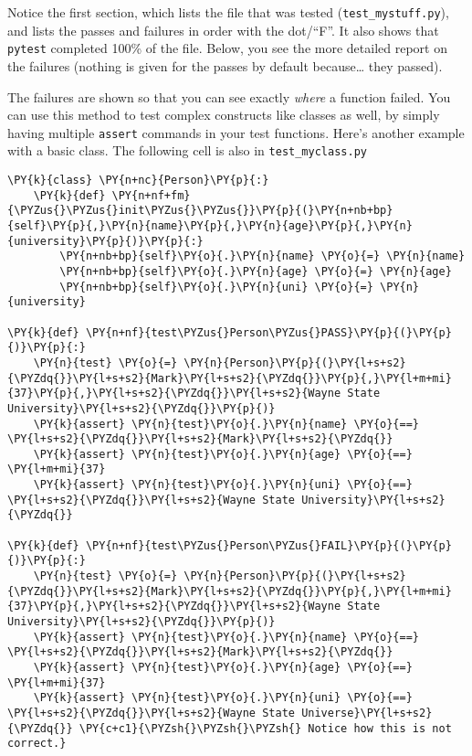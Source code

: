    Notice the first section, which lists the file that was tested
(\texttt{test\_mystuff.py}), and lists the passes and failures in order
with the dot/``F''. It also shows that \texttt{pytest} completed 100\%
of the file. Below, you see the more detailed report on the failures
(nothing is given for the passes by default because\ldots{} they
passed).

The failures are shown so that you can see exactly \emph{where} a
function failed. You can use this method to test complex constructs like
classes as well, by simply having multiple \texttt{assert} commands in
your test functions. Here's another example with a basic class. The
following cell is also in \texttt{test\_myclass.py}

    \begin{tcolorbox}[breakable, size=fbox, boxrule=1pt, pad at break*=1mm,colback=cellbackground, colframe=cellborder]
\begin{Verbatim}[commandchars=\\\{\}]
\PY{k}{class} \PY{n+nc}{Person}\PY{p}{:}
    \PY{k}{def} \PY{n+nf+fm}{\PYZus{}\PYZus{}init\PYZus{}\PYZus{}}\PY{p}{(}\PY{n+nb+bp}{self}\PY{p}{,}\PY{n}{name}\PY{p}{,}\PY{n}{age}\PY{p}{,}\PY{n}{university}\PY{p}{)}\PY{p}{:}
        \PY{n+nb+bp}{self}\PY{o}{.}\PY{n}{name} \PY{o}{=} \PY{n}{name}
        \PY{n+nb+bp}{self}\PY{o}{.}\PY{n}{age} \PY{o}{=} \PY{n}{age}
        \PY{n+nb+bp}{self}\PY{o}{.}\PY{n}{uni} \PY{o}{=} \PY{n}{university}

\PY{k}{def} \PY{n+nf}{test\PYZus{}Person\PYZus{}PASS}\PY{p}{(}\PY{p}{)}\PY{p}{:}
    \PY{n}{test} \PY{o}{=} \PY{n}{Person}\PY{p}{(}\PY{l+s+s2}{\PYZdq{}}\PY{l+s+s2}{Mark}\PY{l+s+s2}{\PYZdq{}}\PY{p}{,}\PY{l+m+mi}{37}\PY{p}{,}\PY{l+s+s2}{\PYZdq{}}\PY{l+s+s2}{Wayne State University}\PY{l+s+s2}{\PYZdq{}}\PY{p}{)}
    \PY{k}{assert} \PY{n}{test}\PY{o}{.}\PY{n}{name} \PY{o}{==} \PY{l+s+s2}{\PYZdq{}}\PY{l+s+s2}{Mark}\PY{l+s+s2}{\PYZdq{}}
    \PY{k}{assert} \PY{n}{test}\PY{o}{.}\PY{n}{age} \PY{o}{==} \PY{l+m+mi}{37}
    \PY{k}{assert} \PY{n}{test}\PY{o}{.}\PY{n}{uni} \PY{o}{==} \PY{l+s+s2}{\PYZdq{}}\PY{l+s+s2}{Wayne State University}\PY{l+s+s2}{\PYZdq{}}

\PY{k}{def} \PY{n+nf}{test\PYZus{}Person\PYZus{}FAIL}\PY{p}{(}\PY{p}{)}\PY{p}{:}
    \PY{n}{test} \PY{o}{=} \PY{n}{Person}\PY{p}{(}\PY{l+s+s2}{\PYZdq{}}\PY{l+s+s2}{Mark}\PY{l+s+s2}{\PYZdq{}}\PY{p}{,}\PY{l+m+mi}{37}\PY{p}{,}\PY{l+s+s2}{\PYZdq{}}\PY{l+s+s2}{Wayne State University}\PY{l+s+s2}{\PYZdq{}}\PY{p}{)}
    \PY{k}{assert} \PY{n}{test}\PY{o}{.}\PY{n}{name} \PY{o}{==} \PY{l+s+s2}{\PYZdq{}}\PY{l+s+s2}{Mark}\PY{l+s+s2}{\PYZdq{}}
    \PY{k}{assert} \PY{n}{test}\PY{o}{.}\PY{n}{age} \PY{o}{==} \PY{l+m+mi}{37}
    \PY{k}{assert} \PY{n}{test}\PY{o}{.}\PY{n}{uni} \PY{o}{==} \PY{l+s+s2}{\PYZdq{}}\PY{l+s+s2}{Wayne State Universe}\PY{l+s+s2}{\PYZdq{}} \PY{c+c1}{\PYZsh{}\PYZsh{}\PYZsh{} Notice how this is not correct.}
\end{Verbatim}
\end{tcolorbox}

